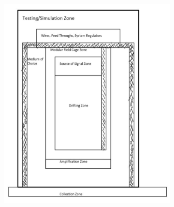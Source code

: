 \begin{figure}[]
\centering
\begin{subfigure}{.45\textwidth}
  \centering
  \includegraphics[width=\textwidth]{images/saq_tpc_insides.png}
  \caption{}
\end{subfigure}%
\begin{subfigure}{.38\textwidth}
  \centering

\end{subfigure}
\end{figure}
